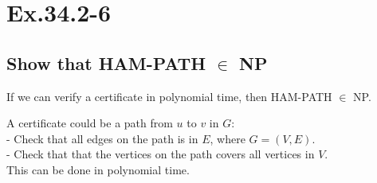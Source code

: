 \section*{Ex.34.2-6}
\subsection*{Show that HAM-PATH $\in$ NP}

If we can verify a certificate in polynomial time, then HAM-PATH $\in$ NP.

A certificate could be a path from $u$ to $v$ in $G$:
\\
- Check that all edges on the path is in $E$, where $G=(V,E)$.
\\
- Check that that the vertices on the path covers all vertices in $V$.
\\
This can be done in polynomial time.